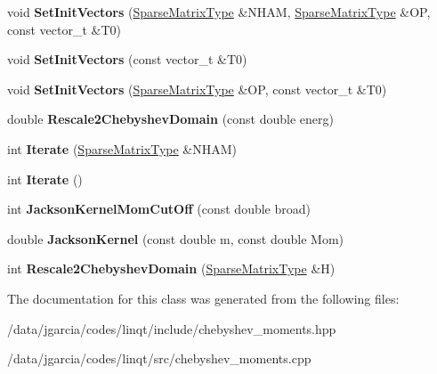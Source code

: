 \begin{DoxyCompactItemize}
\item 
void {\bfseries Set\+Init\+Vectors} (\hyperlink{class_sparse_matrix_type}{Sparse\+Matrix\+Type} \&N\+H\+AM, \hyperlink{class_sparse_matrix_type}{Sparse\+Matrix\+Type} \&OP, const vector\+\_\+t \&T0)\hypertarget{classchebyshev_1_1_moments_a1edb5a95fc3c55790a1c42dcc0c9d6d8}{}\label{classchebyshev_1_1_moments_a1edb5a95fc3c55790a1c42dcc0c9d6d8}

\item 
void {\bfseries Set\+Init\+Vectors} (const vector\+\_\+t \&T0)\hypertarget{classchebyshev_1_1_moments_a50109c2eb34b8b48fa84259e061b557f}{}\label{classchebyshev_1_1_moments_a50109c2eb34b8b48fa84259e061b557f}

\item 
void {\bfseries Set\+Init\+Vectors} (\hyperlink{class_sparse_matrix_type}{Sparse\+Matrix\+Type} \&OP, const vector\+\_\+t \&T0)\hypertarget{classchebyshev_1_1_moments_a41341eff2a0545d3c742ff4518438a03}{}\label{classchebyshev_1_1_moments_a41341eff2a0545d3c742ff4518438a03}

\item 
double {\bfseries Rescale2\+Chebyshev\+Domain} (const double energ)\hypertarget{classchebyshev_1_1_moments_a113588b1702443cf9242f29f557e3d24}{}\label{classchebyshev_1_1_moments_a113588b1702443cf9242f29f557e3d24}

\item 
int {\bfseries Iterate} (\hyperlink{class_sparse_matrix_type}{Sparse\+Matrix\+Type} \&N\+H\+AM)\hypertarget{classchebyshev_1_1_moments_ac5e8717267207fe9a2ef3477a417cdf3}{}\label{classchebyshev_1_1_moments_ac5e8717267207fe9a2ef3477a417cdf3}

\item 
int {\bfseries Iterate} ()\hypertarget{classchebyshev_1_1_moments_a22a6d744e419f7e6311f52ef3bccfde8}{}\label{classchebyshev_1_1_moments_a22a6d744e419f7e6311f52ef3bccfde8}

\item 
int {\bfseries Jackson\+Kernel\+Mom\+Cut\+Off} (const double broad)\hypertarget{classchebyshev_1_1_moments_ab06aa806c3ffdb165ee6a4722c76b03d}{}\label{classchebyshev_1_1_moments_ab06aa806c3ffdb165ee6a4722c76b03d}

\item 
double {\bfseries Jackson\+Kernel} (const double m, const double Mom)\hypertarget{classchebyshev_1_1_moments_a3c5b8faa133bb4a3b8dc2172812ae483}{}\label{classchebyshev_1_1_moments_a3c5b8faa133bb4a3b8dc2172812ae483}

\item 
int {\bfseries Rescale2\+Chebyshev\+Domain} (\hyperlink{class_sparse_matrix_type}{Sparse\+Matrix\+Type} \&H)\hypertarget{classchebyshev_1_1_moments_adf94ad58234e7cfb3a19eb5ce22fda95}{}\label{classchebyshev_1_1_moments_adf94ad58234e7cfb3a19eb5ce22fda95}

\end{DoxyCompactItemize}


The documentation for this class was generated from the following files\+:\begin{DoxyCompactItemize}
\item 
/data/jgarcia/codes/linqt/include/chebyshev\+\_\+moments.\+hpp\item 
/data/jgarcia/codes/linqt/src/chebyshev\+\_\+moments.\+cpp\end{DoxyCompactItemize}
